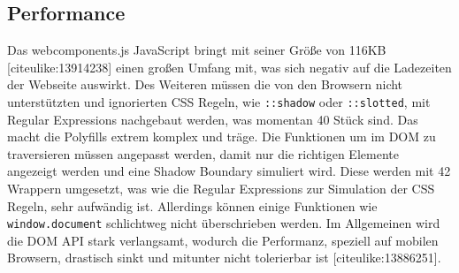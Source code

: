 \subsection{Performance}\label{performance}

Das webcomponents.js JavaScript bringt mit seiner Größe von 116KB
{[}citeulike:13914238{]} einen großen Umfang mit, was sich negativ auf
die Ladezeiten der Webseite auswirkt. Des Weiteren müssen die von den
Browsern nicht unterstützten und ignorierten CSS Regeln, wie
\texttt{::shadow} oder \texttt{::slotted}, mit Regular Expressions
nachgebaut werden, was momentan 40 Stück sind. Das macht die Polyfills
extrem komplex und träge. Die Funktionen um im DOM zu traversieren
müssen angepasst werden, damit nur die richtigen Elemente angezeigt
werden und eine Shadow Boundary simuliert wird. Diese werden mit 42
Wrappern umgesetzt, was wie die Regular Expressions zur Simulation der
CSS Regeln, sehr aufwändig ist. Allerdings können einige Funktionen wie
\texttt{window.document} schlichtweg nicht überschrieben werden. Im
Allgemeinen wird die DOM API stark verlangsamt, wodurch die Performanz,
speziell auf mobilen Browsern, drastisch sinkt und mitunter nicht
tolerierbar ist {[}citeulike:13886251{]}.
